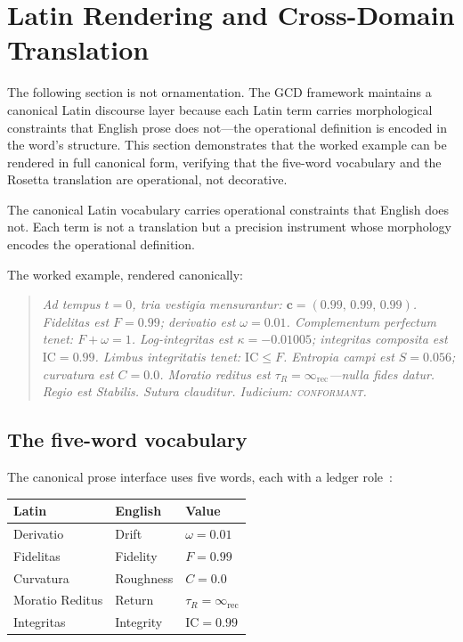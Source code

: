\documentclass[
  aps,
  prd,
  twocolumn,
  superscriptaddress,
  nofootinbib,
  floatfix
]{revtex4-2}
\newcommand{\tR}{\tau_{\!R}}
\newcommand{\IR}{\infty_{\mathrm{rec}}}
\newcommand{\regime}[1]{\textrm{\upshape\scshape#1}}
\newcommand{\conform}{\regime{conformant}}
\newcommand{\tvec}{\mathbf{c}}
\newcommand{\IC}{\mathrm{IC}}
\begin{document}
\section{Latin Rendering and Cross-Domain
Translation}\label{sec:latin}

The following section is not ornamentation.  The GCD framework
maintains a canonical Latin discourse layer because each Latin term
carries morphological constraints that English prose does not---the
operational definition is encoded in the word's structure.  This
section demonstrates that the worked example can be rendered in full
canonical form, verifying that the five-word vocabulary and the
Rosetta translation are operational, not decorative.

The canonical Latin vocabulary carries operational constraints that
English does not.  Each term is not a translation but a precision
instrument whose morphology encodes the operational definition.

The worked example, rendered canonically:

\begin{quote}
\emph{Ad tempus $t = 0$, tria vestigia mensurantur:
$\tvec = (0.99,\, 0.99,\, 0.99)$.  Fidelitas est $F = 0.99$;
derivatio est $\omega = 0.01$.  Complementum perfectum tenet:
$F + \omega = 1$.  Log-integritas est $\kappa = -0.01005$;
integritas composita est $\IC = 0.99$.  Limbus integritatis tenet:
$\IC \leq F$.  Entropia campi est $S = 0.056$; curvatura est
$C = 0.0$.  Moratio reditus est $\tR = \IR$---nulla fides datur.
Regio est Stabilis.  Sutura clauditur.  Iudicium: \conform{}.}
\end{quote}

\subsection{The five-word vocabulary}

The canonical prose interface uses five words, each with a ledger
role~\cite{paulus2025umcp}:

\begin{center}
\begin{tabular}{lll}
\toprule
Latin & English & Value \\
\midrule
Derivatio & Drift & $\omega = 0.01$ \\
Fidelitas & Fidelity & $F = 0.99$ \\
Curvatura & Roughness & $C = 0.0$ \\
Moratio Reditus & Return & $\tR = \IR$ \\
Integritas & Integrity & $\IC = 0.99$ \\
\bottomrule
\end{tabular}
\end{center}
\end{document}
